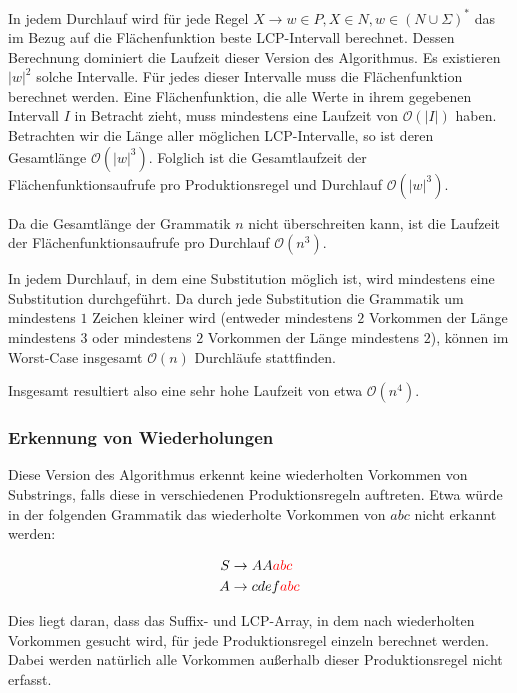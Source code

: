 In jedem Durchlauf wird für jede Regel $X \rightarrow w \in P, X \in N, w \in (N \cup \Sigma)^*$ das im Bezug auf die Flächenfunktion beste LCP-Intervall berechnet. Dessen Berechnung dominiert die Laufzeit dieser Version des Algorithmus. 
Es existieren $|w|^2$ solche Intervalle.
Für jedes dieser Intervalle muss die Flächenfunktion berechnet werden. Eine Flächenfunktion, die alle Werte in ihrem gegebenen Intervall $I$ in Betracht zieht, muss mindestens eine Laufzeit von $\mathcal{O}(|I|)$ haben. Betrachten wir die Länge aller möglichen LCP-Intervalle, so ist deren Gesamtlänge $\mathcal{O}(|w|^3)$. Folglich ist die Gesamtlaufzeit der Flächenfunktionsaufrufe pro Produktionsregel und Durchlauf $\mathcal{O}(|w|^3)$. 

Da die Gesamtlänge der Grammatik $n$ nicht überschreiten kann, ist die Laufzeit der Flächenfunktionsaufrufe pro Durchlauf $\mathcal{O}(n^3)$. 

In jedem Durchlauf, in dem eine Substitution möglich ist, wird mindestens eine Substitution durchgeführt. Da durch jede Substitution die Grammatik um mindestens $1$ Zeichen kleiner wird (entweder mindestens $2$ Vorkommen der Länge mindestens $3$ oder mindestens $2$ Vorkommen der Länge mindestens $2$), können im Worst-Case insgesamt $\mathcal{O}(n)$ Durchläufe stattfinden.

Insgesamt resultiert also eine sehr hohe Laufzeit von etwa $\mathcal{O}(n^4)$.

\subsubsection{Erkennung von Wiederholungen}

Diese Version des Algorithmus erkennt keine wiederholten Vorkommen von Substrings, falls diese in verschiedenen Produktionsregeln auftreten.
Etwa würde in der folgenden Grammatik das wiederholte Vorkommen von $abc$ nicht erkannt werden:

\begin{align*}
	S &\rightarrow AA\textcolor{red}{abc}\\
	A &\rightarrow cdef\textcolor{red}{abc}
\end{align*}

Dies liegt daran, dass das Suffix- und LCP-Array, in dem nach wiederholten Vorkommen gesucht wird, für jede Produktionsregel einzeln berechnet werden. Dabei werden natürlich alle Vorkommen außerhalb dieser Produktionsregel nicht erfasst.